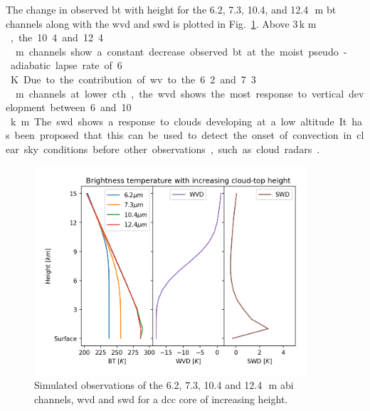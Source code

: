 The change in observed \acrshort{bt} with height for the 6.2, 7.3, 10.4, and 12.4\,\unit{\mu m} \acrshort{bt} channels along with the \acrshort{wvd} and \acrshort{swd} is plotted in Fig.~\ref{fig:cloud_height_channels}. 
Above 3\,\unit{k m }, the 10.4 and 12.4\,\unit{\mu m} channels show a constant decrease observed \acrshort{bt} at the moist pseudo-adiabatic lapse rate of 6\,\unit{K}.
Due to the contribution of \acrshort{wv} to the 6.2 and 7.3\,\unit{\mu m} channels at lower \acrshort{cth}, the \acrshort{wvd} shows the most response to vertical development between 6 and 10\,\unit{k m}.
The \acrshort{swd} shows a response to clouds developing at a low altitude.
It has been proposed that this can be used to detect the onset of convection in clear sky conditions before other observations, such as cloud radars \citep{lindsey_use_2014, lindsey_using_2018}.


\begin{figure}[tp]
    \includegraphics[width=0.9\textwidth]{figures/chapter1_06.png}
    \caption[
    Simulated observations of the 6.2, 7.3, 10.4 and 12.4\,\unit{\mu m} \acrshort{abi} channels, \acrshort{wvd} and \acrshort{swd} for a \acrshort{dcc} core of increasing height
    ]{
    Simulated observations of the 6.2, 7.3, 10.4 and 12.4\,\unit{\mu m} \acrshort{abi} channels, \acrshort{wvd} and \acrshort{swd} for a \acrshort{dcc} core of increasing height.
    }
    \label{fig:cloud_height_channels}
\end{figure}


